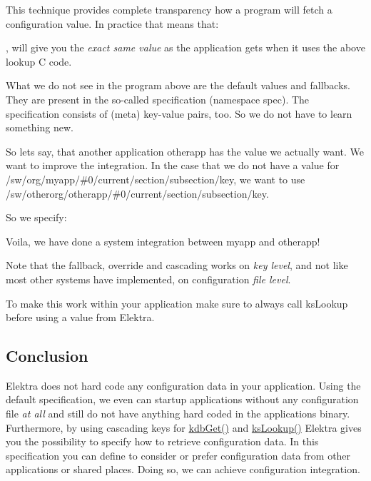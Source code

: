 

This technique provides complete transparency how a program will fetch a configuration value. In practice that means that\+:




, will give you the {\itshape exact same value} as the application gets when it uses the above lookup C code.

What we do not see in the program above are the default values and fallbacks. They are present in the so-\/called specification (namespace {\ttfamily spec}). The specification consists of (meta) key-\/value pairs, too. So we do not have to learn something new.

So lets say, that another application {\ttfamily otherapp} has the value we actually want. We want to improve the integration. In the case that we do not have a value for {\ttfamily /sw/org/myapp/\#0/current/section/subsection/key}, we want to use {\ttfamily /sw/otherorg/otherapp/\#0/current/section/subsection/key}.

So we specify\+:




Voila, we have done a system integration between {\ttfamily myapp} and {\ttfamily otherapp}!

Note that the fallback, override and cascading works on {\itshape key level}, and not like most other systems have implemented, on configuration {\itshape file level}.

To make this work within your application make sure to always call {\ttfamily ks\+Lookup} before using a value from Elektra.

\subsection*{Conclusion}

Elektra does not hard code any configuration data in your application. Using the {\ttfamily default} specification, we even can startup applications without any configuration file {\itshape at all} and still do not have anything hard coded in the applications binary. Furthermore, by using cascading keys for {\ttfamily \hyperlink{group__kdb_ga28e385fd9cb7ccfe0b2f1ed2f62453a1}{kdb\+Get()}} and {\ttfamily \hyperlink{group__keyset_gaa34fc43a081e6b01e4120daa6c112004}{ks\+Lookup()}} Elektra gives you the possibility to specify how to retrieve configuration data. In this specification you can define to consider or prefer configuration data from other applications or shared places. Doing so, we can achieve configuration integration.

